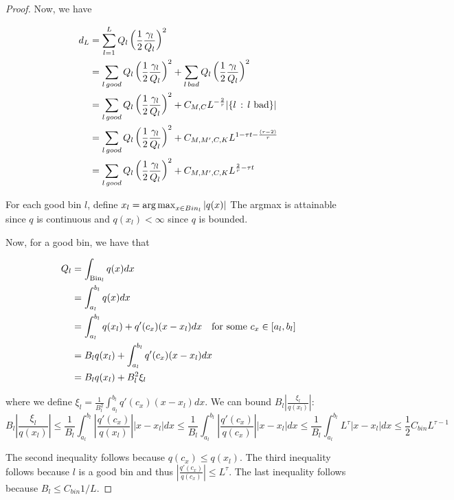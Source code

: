 \begin{proof}
Now, we have

\begin{align*}
d_L &= \sum_{l=1}^L Q_l \left( \frac{1}{2} \frac{\gamma_l}{Q_l} \right)^2 \\
  &= \sum_{l \, good} Q_l \left( \frac{1}{2} \frac{\gamma_l}{Q_l} \right)^2 + 
      \sum_{l \, bad} Q_l \left( \frac{1}{2} \frac{\gamma_l}{Q_l} \right)^2 \\
   &=   \sum_{l \, good} Q_l \left( \frac{1}{2} \frac{\gamma_l}{Q_l} \right)^2 + 
       C_{M, C} L^{-\frac{2}{r}} | \{ l \,:\, l \textrm{ bad} \}| \\
   &=  \sum_{l \, good} Q_l \left( \frac{1}{2} \frac{\gamma_l}{Q_l} \right)^2 + 
          C_{M, M', C, K} L^{1 - \tau t - \frac{(r-2)}{r}} \\
  &=  \sum_{l \, good} Q_l \left( \frac{1}{2} \frac{\gamma_l}{Q_l} \right)^2 + 
        C_{M, M', C, K} L^{\frac{2}{r} - \tau t} \\
\end{align*}


For each good bin $l$, define $x_l = \mathop{\text{\rm arg\,max}}_{x \in Bin_l} | q(x) |$ The argmax is attainable since $q$ is continuous and $q(x_l) < \infty$ since $q$ is bounded.

Now, for a good bin, we have that 

\begin{align*}
Q_l &= \int_{\textrm{Bin}_l} q(x) dx \\
  &= \int_{a_l}^{b_l} q(x) dx \\
 &= \int_{a_l}^{b_l} q(x_l) + q'(c_x) (x - x_l) dx \quad \textrm{for some $c_x \in [a_l, b_l]$}\\
 &= B_l q(x_l) + \int_{a_l}^{b_l} q'(c_x)(x-x_l) dx  \\
 &= B_l q(x_l) + B_l^2 \xi_l \\
\end{align*}

where we define $\xi_l = \frac{1}{B_l^2} \int_{a_l}^{b_l} q'(c_x) (x-x_l) dx$. We can bound $B_l \left| \frac{\xi_l}{q(x_l)} \right|$:
$$
B_l \left| \frac{\xi_l}{q(x_l)} \right| 
    \leq \frac{1}{B_l} \int_{a_l}^{b_l} \left|\frac{q'(c_x)}{q(x_l)} \right| |x - x_l| dx 
   \leq \frac{1}{B_l} \int_{a_l}^{b_l} \left|\frac{q'(c_x)}{q(c_x)} \right| |x - x_l| dx 
                \leq \frac{1}{B_l} \int_{a_l}^{b_l} L^{\tau} |x - x_l| dx \leq 
 \frac{1}{2} C_{bin} L^{\tau - 1} 
$$ 

The second inequality follows because $q(c_x) \leq q(x_l)$. The third inequality follows because $l$ is a good bin and thus
$\left| \frac{q'(c_x)}{q(c_x)} \right| \leq L^\tau$. The last inequality follows because $B_l \leq C_{bin} 1/L$. 



\end{proof}
